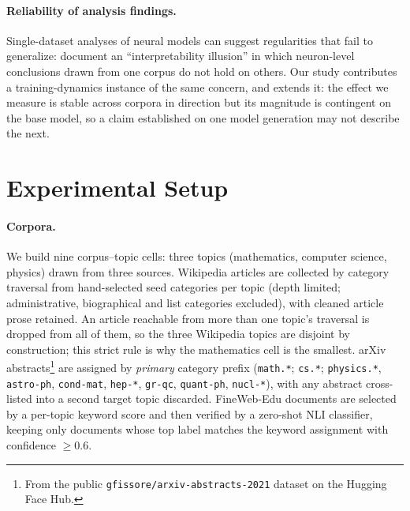\documentclass[11pt]{article}
\begin{document}
\paragraph{Reliability of analysis findings.}
Single-dataset analyses of neural models can suggest regularities that fail
to generalize: \citet{bolukbasi2021illusion} document an ``interpretability
illusion'' in which neuron-level conclusions drawn from one corpus do not
hold on others. Our study contributes a training-dynamics instance of the
same concern, and extends it: the effect we measure is stable across corpora
in direction but its magnitude is contingent on the base model, so a claim
established on one model generation may not describe the next.

\section{Experimental Setup}
\label{sec:setup}

\paragraph{Corpora.}
We build nine corpus--topic cells: three topics (mathematics, computer
science, physics) drawn from three sources. Wikipedia articles are collected
by category traversal from hand-selected seed categories per topic (depth
limited; administrative, biographical and list categories excluded), with
cleaned article prose retained. An article reachable from more than one
topic's traversal is dropped from all of them, so the three Wikipedia topics
are disjoint by construction; this strict rule is why the mathematics cell
is the smallest. arXiv abstracts\footnote{From the public
\texttt{gfissore/arxiv-abstracts-2021} dataset on the Hugging Face Hub.} are
assigned by \emph{primary} category prefix (\texttt{math.*}; \texttt{cs.*}; \texttt{physics.*},
\texttt{astro-ph}, \texttt{cond-mat}, \texttt{hep-*}, \texttt{gr-qc},
\texttt{quant-ph}, \texttt{nucl-*}), with any abstract cross-listed into a
second target topic discarded. FineWeb-Edu \citep{penedo2024fineweb} documents
are selected by a per-topic keyword score and then verified by a zero-shot NLI classifier,
keeping only documents whose top label matches the keyword assignment with
confidence $\geq 0.6$.
\end{document}

